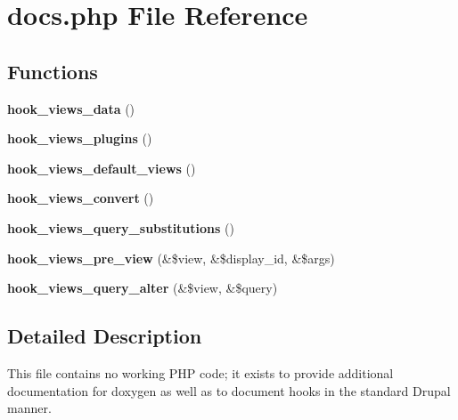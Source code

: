 \section{docs.php File Reference}
\label{docs_8php}
\subsection*{Functions}
\begin{CompactItemize}
\item 
{\bf hook\_\-views\_\-data} ()
\item 
{\bf hook\_\-views\_\-plugins} ()
\item 
{\bf hook\_\-views\_\-default\_\-views} ()
\item 
{\bf hook\_\-views\_\-convert} ()
\item 
{\bf hook\_\-views\_\-query\_\-substitutions} ()
\item 
{\bf hook\_\-views\_\-pre\_\-view} (\&\$view, \&\$display\_\-id, \&\$args)
\item 
{\bf hook\_\-views\_\-query\_\-alter} (\&\$view, \&\$query)
\end{CompactItemize}


\subsection{Detailed Description}
This file contains no working PHP code; it exists to provide additional documentation for doxygen as well as to document hooks in the standard Drupal manner. 